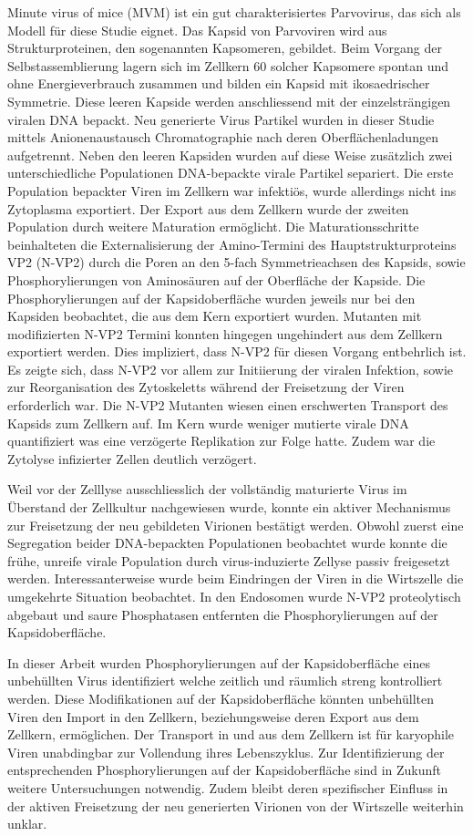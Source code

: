 Minute virus of mice (MVM) ist ein gut charakterisiertes Parvovirus, das sich als Modell für diese Studie eignet. Das Kapsid von Parvoviren wird aus Strukturproteinen, den sogenannten Kapsomeren, gebildet. Beim Vorgang der Selbstassemblierung lagern sich im Zellkern 60 solcher Kapsomere spontan und ohne Energieverbrauch zusammen und bilden ein Kapsid mit ikosaedrischer Symmetrie. Diese leeren Kapside werden anschliessend mit der einzelsträngigen viralen DNA bepackt. Neu generierte Virus Partikel wurden in dieser Studie mittels A\-ni\-o\-nen\-aus\-tausch Chromatographie nach deren Oberflächenladungen aufgetrennt. Neben den leeren Kapsiden wurden auf diese Weise zusätzlich zwei unterschiedliche Populationen DNA-bepackte virale Partikel separiert. Die erste Population bepackter Viren im Zellkern war infektiös, wurde allerdings nicht ins Zytoplasma exportiert. Der Export aus dem Zellkern wurde der zweiten Population durch weitere Maturation ermöglicht. Die Maturationsschritte beinhalteten die Externalisierung der Amino-Termini des Hauptstrukturproteins VP2 (N-VP2) durch die Poren an den 5-fach Symmetrieachsen des Kapsids, sowie Phosphorylierungen von Aminosäuren auf der Oberfläche der Kapside. Die Phosphorylierungen auf der Kapsidoberfläche wurden jeweils nur bei den Kapsiden beobachtet, die aus dem Kern exportiert wurden. Mutanten mit modifizierten N-VP2 Termini konnten hingegen ungehindert aus dem Zellkern exportiert werden. Dies impliziert, dass N-VP2 für diesen Vorgang entbehrlich ist. Es zeigte sich, dass N-VP2 vor allem zur Initiierung der viralen Infektion, sowie zur Reorganisation des Zytoskeletts während der Freisetzung der Viren erforderlich war. Die N-VP2 Mutanten wiesen einen erschwerten Transport des Kapsids zum Zellkern auf. Im Kern wurde weniger mutierte virale DNA quantifiziert was eine verzögerte Replikation zur Folge hatte. Zudem war die Zytolyse infizierter Zellen deutlich verzögert.  

Weil vor der Zelllyse ausschliesslich der vollständig maturierte Virus im Überstand der Zellkultur nachgewiesen wurde, konnte ein aktiver Mechanismus zur Freisetzung der neu gebildeten Virionen bestätigt werden. Obwohl zuerst eine Segregation beider DNA-bepackten Populationen beobachtet wurde konnte die frühe, unreife virale Population durch virus-induzierte Zellyse passiv freigesetzt werden. Interessanterweise wurde beim Eindringen der Viren in die Wirtszelle die umgekehrte Situation beobachtet. In den Endosomen wurde N-VP2 proteolytisch abgebaut und saure Phosphatasen entfernten die Phosphorylierungen auf der Kapsidoberfläche. 

In dieser Arbeit wurden Phosphorylierungen auf der Kapsidoberfläche eines unbehüllten Virus identifiziert welche zeitlich und räumlich streng kontrolliert werden. Diese Modifikationen auf der Kapsidoberfläche könnten unbehüllten Viren den Import in den Zellkern, beziehungsweise deren Export aus dem Zellkern, ermöglichen. Der Transport in und aus dem Zellkern ist für karyophile Viren unabdingbar zur Vollendung ihres Lebenszyklus. Zur Identifizierung der entsprechenden Phosphorylierungen auf der Kapsidoberfläche sind in Zukunft weitere Untersuchungen notwendig. Zudem bleibt deren spezifischer Einfluss in der aktiven Freisetzung der neu generierten Virionen von der Wirtszelle weiterhin unklar.
